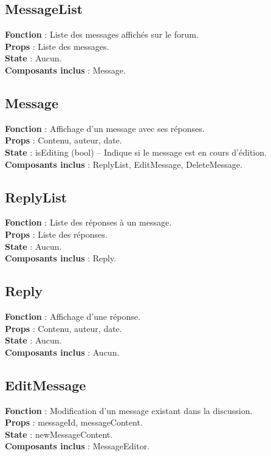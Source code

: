 \documentclass{article}
\begin{document}
\subsection*{MessageList}
\textbf{Fonction} : Liste des messages affichés sur le forum.\\
\textbf{Props} : Liste des messages.\\
\textbf{State} : Aucun.\\
\textbf{Composants inclus} : Message.

\subsection*{Message}
\textbf{Fonction} : Affichage d'un message avec ses réponses.\\
\textbf{Props} : Contenu, auteur, date.\\
\textbf{State} : isEditing (bool) – Indique si le message est en cours d'édition.\\
\textbf{Composants inclus} : ReplyList, EditMessage, DeleteMessage.

\subsection*{ReplyList}
\textbf{Fonction} : Liste des réponses à un message.\\
\textbf{Props} : Liste des réponses.\\
\textbf{State} : Aucun.\\
\textbf{Composants inclus} : Reply.

\subsection*{Reply}
\textbf{Fonction} : Affichage d'une réponse.\\
\textbf{Props} : Contenu, auteur, date.\\
\textbf{State} : Aucun.\\
\textbf{Composants inclus} : Aucun.

\subsection*{EditMessage}
\textbf{Fonction} : Modification d'un message existant dans la discussion.\\
\textbf{Props} : messageId, messageContent.\\
\textbf{State} : newMessageContent.\\
\textbf{Composants inclus} : MessageEditor.
\end{document}
